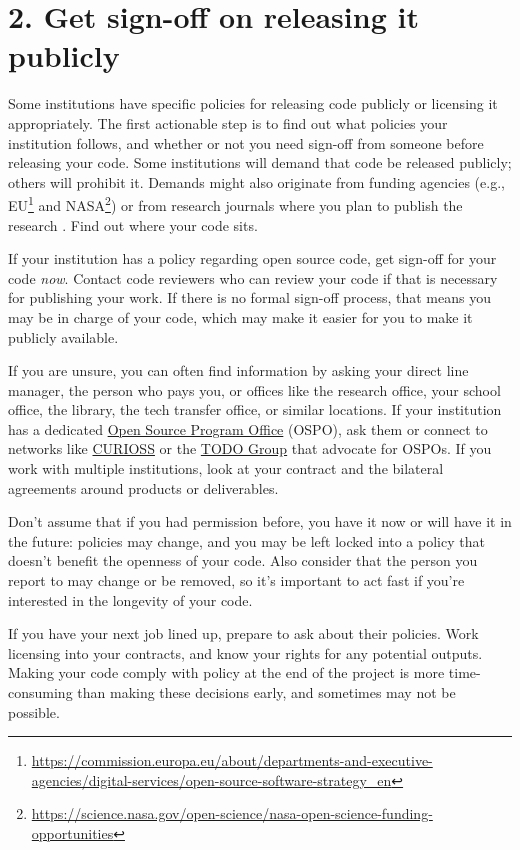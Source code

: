 \documentclass[10pt,letterpaper]{article}
\begin{document}
\section*{2. Get sign-off on releasing it publicly}

Some institutions have specific policies for releasing code publicly or licensing it appropriately.
The first actionable step is to find out what policies your institution follows,
and whether or not you need sign-off from someone before releasing your code.
Some institutions will demand that code be released publicly;
others will prohibit it.
Demands might also originate from funding agencies
(e.g.,
EU\footnote{\url{https://commission.europa.eu/about/departments-and-executive-agencies/digital-services/open-source-software-strategy_en}}
and NASA\footnote{\url{https://science.nasa.gov/open-science/nasa-open-science-funding-opportunities}})
or from research journals where you plan to publish the research
\cite{Katz2018,Ham2019}.
Find out where your code sits.

If your institution has a policy regarding open source code,
get sign-off for your code \emph{now}.
Contact code reviewers who can review your code if that is necessary for publishing your work.
If there is no formal sign-off process,
that means you may be in charge of your code,
which may make it easier for you to make it publicly available.

If you are unsure,
you can often find information by asking your direct line manager,
the person who pays you,
or offices like the research office,
your school office,
the library,
the tech transfer office,
or similar locations.
If your institution has a dedicated
\href{https://sustainoss.org/academic-map/universities/index.html}{Open Source Program Office} (OSPO),
ask them
or connect to networks like \href{https://curioss.org}{CURIOSS}
or the \href{https://todogroup.org/}{TODO Group}
that advocate for OSPOs.
If you work with multiple institutions,
look at your contract and the bilateral agreements around products or deliverables.

Don't assume that if you had permission before,
you have it now or will have it in the future:
policies may change,
and you may be left locked into a policy that doesn't benefit the openness of your code.
Also consider that the person you report to may change or be removed,
so it's important to act fast if you're interested in the longevity of your code.

If you have your next job lined up,
prepare to ask about their policies.
Work licensing into your contracts,
and know your rights for any potential outputs.
Making your code comply with policy at the end of the project is more time-consuming than making these decisions early,
and sometimes may not be possible.
\end{document}
